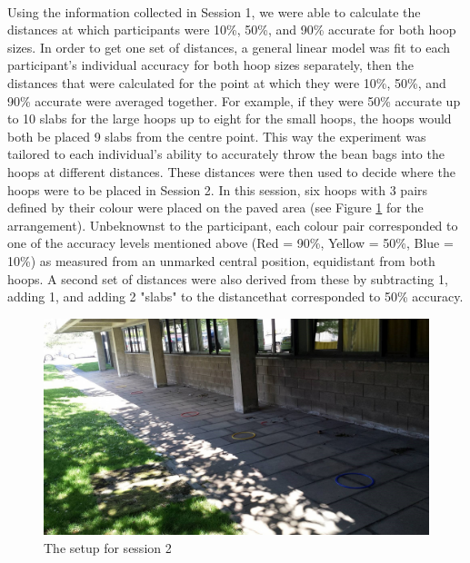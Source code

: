 \documentclass[12pt]{article}
\begin{document}
\paragraph{} Using the information collected in Session 1, we were able to calculate the distances at which participants were 10\%, 50\%, and 90\% accurate for both hoop sizes. In order to get one set of distances, a general linear model was fit to each participant's individual accuracy for both hoop sizes separately, then the distances that were calculated for the point at which they were 10\%, 50\%, and 90\% accurate were averaged together. For example, if they were 50\% accurate up to 10 slabs for the large hoops up to eight for the small hoops, the hoops would both be placed 9 slabs from the centre point. This way the experiment was tailored to each individual's ability to accurately throw the bean bags into the hoops at different distances. These distances were then used to decide where the hoops were to be placed in Session 2. In this session, six hoops with 3 pairs defined by their colour were placed on the paved area (see Figure \ref{fig:Session2-Throwing} for the arrangement). Unbeknownst to the participant, each colour pair corresponded to one of the accuracy levels mentioned above (Red = 90\%, Yellow = 50\%, Blue = 10\%) as measured from an unmarked central position, equidistant from both hoops. A second set of distances were also derived from these by subtracting 1, adding 1, and adding 2 "slabs" to the distancethat corresponded to 50\% accuracy.

\begin{figure}[ht!]
	\includegraphics[scale=0.33]{Figures/Experiment_1_Awareness/Layout_part2}
	\centering
	\captionsetup{justification=centering}
	\caption{The setup for session 2}
	\label{fig:Session2-Throwing}
	\vspace{-0.5cm}
\end{figure}
\end{document}

